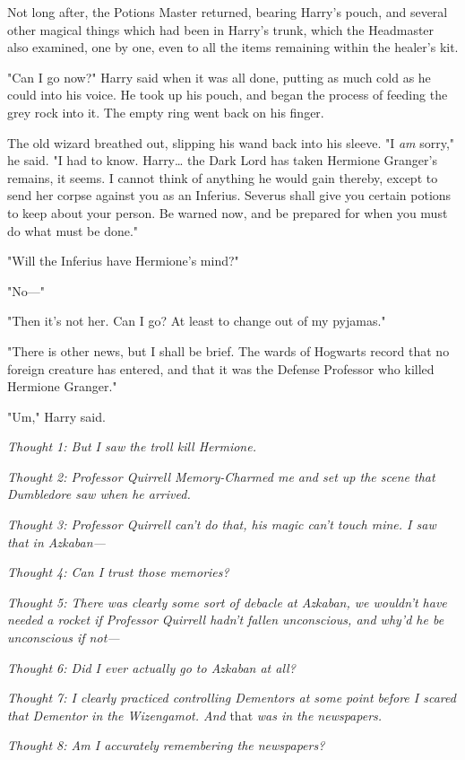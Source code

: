 Not long after, the Potions Master returned, bearing Harry's pouch, and several 
other magical things which had been in Harry's trunk, which the Headmaster also 
examined, one by one, even to all the items remaining within the healer's kit.

"Can I go now?" Harry said when it was all done, putting as much cold as he 
could into his voice. He took up his pouch, and began the process of feeding 
the grey rock into it. The empty ring went back on his finger.

The old wizard breathed out, slipping his wand back into his sleeve. "I 
\emph{am} sorry," he said. "I had to know. Harry{\ldots} the Dark Lord has 
taken Hermione Granger's remains, it seems. I cannot think of anything he would 
gain thereby, except to send her corpse against you as an Inferius. Severus 
shall give you certain potions to keep about your person. Be warned now, and be 
prepared for when you must do what must be done."

"Will the Inferius have Hermione's mind?"

"No---"

"Then it's not her. Can I go? At least to change out of my pyjamas."

"There is other news, but I shall be brief. The wards of Hogwarts record that 
no foreign creature has entered, and that it was the Defense Professor who 
killed Hermione Granger."

"Um," Harry said.

\emph{Thought 1: But I saw the troll kill Hermione.}

\emph{Thought 2: Professor Quirrell Memory-Charmed me and set up the scene that 
Dumbledore saw when he arrived.}

\emph{Thought 3: Professor Quirrell can't do that, his magic can't touch mine. 
I saw that in Azkaban---}

\emph{Thought 4: Can I trust those memories?}

\emph{Thought 5: There was clearly some sort of debacle at Azkaban, we wouldn't 
have needed a rocket if Professor Quirrell hadn't fallen unconscious, and why'd 
he be unconscious if not---}

\emph{Thought 6: Did I ever actually go to Azkaban at all?}

\emph{Thought 7: I clearly practiced controlling Dementors at some point before 
I scared that Dementor in the Wizengamot. And} that \emph{was in the 
newspapers.}

\emph{Thought 8: Am I accurately remembering the newspapers?}

